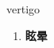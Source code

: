 
\begin{frame}
{\huge vertigo}
\begin{center}
\begin{enumerate}\Large
  \item \textbf{眩晕}
\end{enumerate}
\end{center}
\end{frame}
